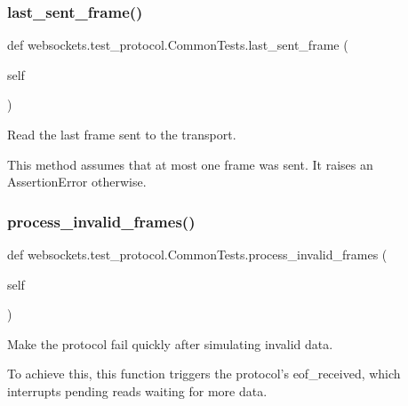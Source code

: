 \subsubsection{\texorpdfstring{last\+\_\+sent\+\_\+frame()}{last\_sent\_frame()}}
{\footnotesize\ttfamily def websockets.\+test\+\_\+protocol.\+Common\+Tests.\+last\+\_\+sent\+\_\+frame (\begin{DoxyParamCaption}\item[{}]{self }\end{DoxyParamCaption})}

\begin{DoxyVerb}Read the last frame sent to the transport.

This method assumes that at most one frame was sent. It raises an
AssertionError otherwise.\end{DoxyVerb}
 \mbox{\label{classwebsockets_1_1test__protocol_1_1_common_tests_a9a2dab3248e4839526c94dec66017e90}} 
\subsubsection{\texorpdfstring{process\+\_\+invalid\+\_\+frames()}{process\_invalid\_frames()}}
{\footnotesize\ttfamily def websockets.\+test\+\_\+protocol.\+Common\+Tests.\+process\+\_\+invalid\+\_\+frames (\begin{DoxyParamCaption}\item[{}]{self }\end{DoxyParamCaption})}

\begin{DoxyVerb}Make the protocol fail quickly after simulating invalid data.

To achieve this, this function triggers the protocol's eof_received,
which interrupts pending reads waiting for more data.\end{DoxyVerb}
 \mbox{\label{classwebsockets_1_1test__protocol_1_1_common_tests_ac492a5ff533df2e78be496015f192a20}} 
